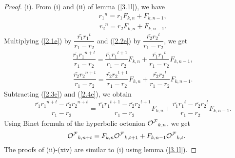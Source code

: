 \begin{proof}
(i). From (i) and (ii) of lemma (\ref{3.1l}), we have
\begin{align}\label{2.1e}
&\quad {r_1}^n=r_1 {F}_{k,n}+{F}_{k,n-1},
\end{align}
\begin{align}\label{2.2e}
&\quad {r_2}^n=r_2 {F}_{k,n}+{F}_{k,n-1}.
\end{align}
Multiplying (\ref{2.1e}) by $\dfrac{\bar{r_1}{r_1}^t}{r_1-r_2}$ and (\ref{2.2e}) by $\dfrac{\bar{r_2}{r_2}^t}{r_1-r_2}$, we get
\begin{align}\label{2.3e}
&\quad \dfrac{\bar{r_1}{r_1}^{n+t}}{r_1-r_2}=\dfrac{\bar{r_1}{r_1}^{t+1}}{r_1-r_2} {F}_{k,n}+\dfrac{\bar{r_1}{r_1}^{t}}{r_1-r_2}{F}_{k,n-1},
\end{align}
\begin{align}\label{2.4e}
&\quad \dfrac{\bar{r_2}{r_2}^{n+t}}{r_1-r_2}=\dfrac{\bar{r_2}{r_2}^{t+1}}{r_1-r_2} {F}_{k,n}+\dfrac{\bar{r_2}{r_2}^{t}}{r_1-r_2}{F}_{k,n-1}.
\end{align}
Subtracting (\ref{2.3e}) and (\ref{2.4e}), we obtain
\begin{align*}
&\quad \dfrac{\bar{r_1}{r_1}^{n+t}-\bar{r_2}{r_2}^{n+t}}{r_1-r_2}=\dfrac{\bar{r_1}{r_1}^{t+1}-\bar{r_2}{r_2}^{t+1}}{r_1-r_2} {F}_{k,n}+\dfrac{\bar{r_1}{r_1}^{t}-\bar{r_2}{r_2}^{t}}{r_1-r_2}{F}_{k,n-1}.
\end{align*}
Using Binet formula of the hyperbolic \kF\vspace{0mm} octonion ${{\mathcal{O^F}}}_{k,n}$, we get
\begin{align*}
&\quad{{\mathcal{O^F}}}_{k,n+t}={F}_{k,n}{{\mathcal{O^F}}}_{k,t+1}+{F}_{k,n-1}{{\mathcal{O^F}}}_{k,t}.
\end{align*}
The proofs of (ii)-(xiv) are similar to (i) using lemma (\ref{3.1l}).
\end{proof}
